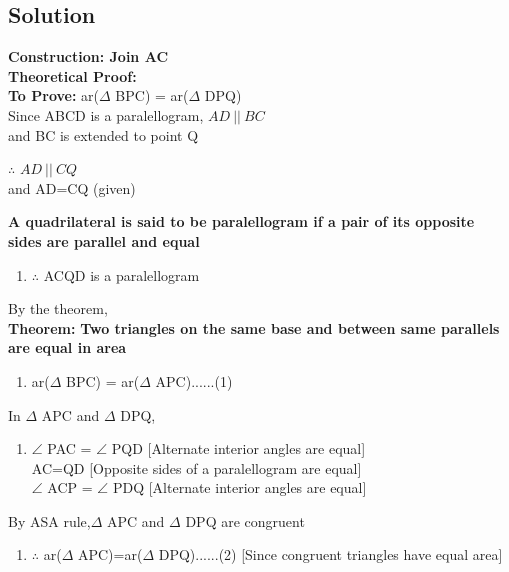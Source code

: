 \documentclass[journal,12pt,twocolumn]{IEEEtran}
\begin{document}
\begin{tableofcontents}
\section{Solution}
\justify
\textbf{Construction: Join AC}\\
\textbf{Theoretical Proof:}\\
\textbf{To Prove:}
ar($\Delta$ BPC) = ar($\Delta$ DPQ)\\
Since ABCD is a paralellogram, $ AD \: || \: BC $\\
and BC is extended to point Q\\
\begin{enumerate}
$\therefore$ $ AD \: || \: CQ $\\ and AD=CQ  (given)\\
\end{enumerate}
\textbf{A quadrilateral is said to be paralellogram if a pair of its opposite sides are parallel and equal}\\
\begin{enumerate}
\item[]
$\therefore$ ACQD is a paralellogram\\
\end{enumerate}
By the theorem,\\
\textbf{Theorem:}
\textbf{Two triangles on the same base and between same parallels are equal in area}\\
\begin{enumerate}
\item[]
ar($\Delta$ BPC) = ar($\Delta$ APC)......(1)\\
\end{enumerate}
In $\Delta$ APC and $\Delta$ DPQ,\\
\begin{enumerate}
\item[]
$\angle$ PAC = $\angle$ PQD [Alternate interior angles are equal]\\ 
AC=QD [Opposite sides of a paralellogram are equal]\\
$\angle$ ACP = $\angle$ PDQ [Alternate interior angles are equal]\\
\end{enumerate}
By ASA rule,$\Delta$ APC and $\Delta$ DPQ are congruent\\
\begin{enumerate}
\item[] $\therefore$ ar($\Delta$ APC)=ar($\Delta$ DPQ)......(2) [Since congruent triangles have equal area]\\
\end{enumerate}

\end{tableofcontents}
\end{document}
